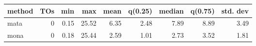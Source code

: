 \begin{tabular}{lrrrrrrrr}
\hline
 method   &   TOs &   min &   max &   mean &   q(0.25) &   median &   q(0.75) &   std. dev \\
\hline
 mata     &  0 &  0.15 & 25.52 &   6.35 &      2.48 &     7.89 &      8.89 &       3.49 \\
 mona     &  0 &  0.18 & 25.44 &   2.59 &      1.01 &     2.73 &      3.52 &       1.81 \\
\hline
\end{tabular}
